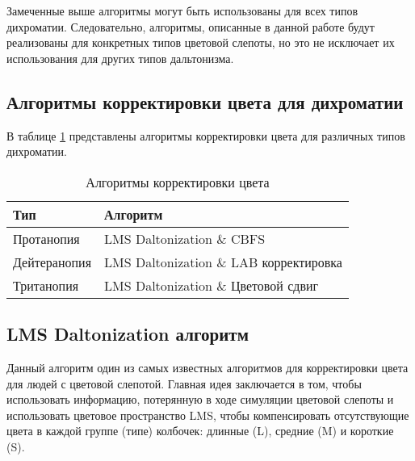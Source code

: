 \documentclass[a4paper,14pt, unknownkeysallowed]{extreport}
\begin{document}
    Замеченные выше алгоритмы могут быть использованы для всех типов дихроматии. Следовательно, алгоритмы, описанные в данной работе будут реализованы для конкретных типов цветовой слепоты, но это не исключает их использования для других типов дальтонизма.

    \subsection{Алгоритмы корректировки цвета для дихроматии}

    В таблице \ref{tab:colorblind_algos} представлены алгоритмы корректировки цвета для различных типов дихроматии.

    \begin{table}[h]
        \centering
        \begin{tabular}{|l|l|}
        \hline
        Тип           & Алгоритм                                 \\ \hline
        Протанопия    & LMS Daltonization \& CBFS                \\ \hline
        Дейтеранопия  & LMS Daltonization \& LAB корректировка   \\ \hline
        Тританопия    & LMS Daltonization \& Цветовой сдвиг      \\ \hline
        \end{tabular}
        \caption{Алгоритмы корректировки цвета}
        \label{tab:colorblind_algos}
    \end{table}

    \subsection{LMS Daltonization алгоритм}

    Данный алгоритм один из самых известных алгоритмов для корректировки цвета для людей с цветовой слепотой.
    Главная идея заключается в том, чтобы использовать информацию, потерянную в ходе симуляции цветовой слепоты и использовать цветовое пространство LMS, чтобы компенсировать отсутствующие цвета в каждой группе (типе) колбочек: длинные (L), средние (M) и короткие (S).
\end{document}
